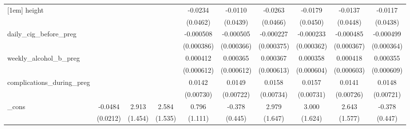 \begin{table}[htbp]
\begin{tabular}{l*{9}{c}}
[1em]
height      &                     &                     &                     &     -0.0234         &     -0.0110         &     -0.0263         &     -0.0179         &     -0.0137         &     -0.0117         \\
            &                     &                     &                     &    (0.0462)         &    (0.0439)         &    (0.0466)         &    (0.0450)         &    (0.0448)         &    (0.0438)         \\
[1em]
daily\_cig\_before\_preg&                     &                     &                     &   -0.000508         &   -0.000505         &   -0.000227         &   -0.000233         &   -0.000485         &   -0.000499         \\
            &                     &                     &                     &  (0.000386)         &  (0.000366)         &  (0.000375)         &  (0.000362)         &  (0.000367)         &  (0.000364)         \\
[1em]
weekly\_alcohol\_b\_preg&                     &                     &                     &    0.000412         &    0.000365         &    0.000367         &    0.000358         &    0.000418         &    0.000355         \\
            &                     &                     &                     &  (0.000612)         &  (0.000612)         &  (0.000613)         &  (0.000604)         &  (0.000603)         &  (0.000609)         \\
[1em]
complications\_during\_preg&                     &                     &                     &      0.0142\sym{*}  &      0.0149\sym{**} &      0.0158\sym{**} &      0.0157\sym{**} &      0.0141\sym{*}  &      0.0148\sym{**} \\
            &                     &                     &                     &   (0.00730)         &   (0.00722)         &   (0.00734)         &   (0.00731)         &   (0.00726)         &   (0.00721)         \\
[1em]
\_cons      &     -0.0484\sym{**} &       2.913\sym{**} &       2.584\sym{*}  &       0.796         &      -0.378         &       2.979\sym{*}  &       3.000\sym{*}  &       2.643\sym{*}  &      -0.378         \\
            &    (0.0212)         &     (1.454)         &     (1.535)         &     (1.111)         &     (0.445)         &     (1.647)         &     (1.624)         &     (1.577)         &     (0.447)         \\
\hline

\end{tabular}
\end{table}

